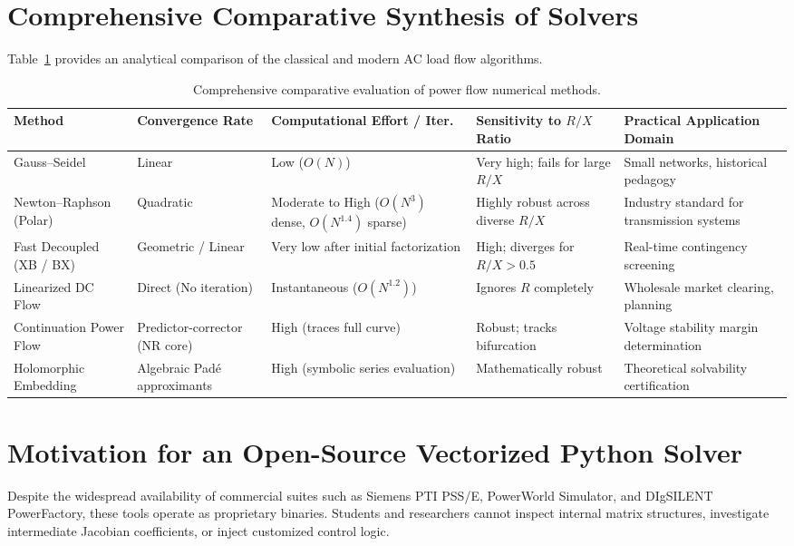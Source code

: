 \documentclass[12pt,a4paper,oneside]{report}
\begin{document}
\section{Comprehensive Comparative Synthesis of Solvers}
Table~\ref{tab:solver_comparison} provides an analytical comparison of the classical and modern AC load flow algorithms.

\begin{table}[htbp]
\centering
\caption{Comprehensive comparative evaluation of power flow numerical methods.}
\label{tab:solver_comparison}
\small
\begin{tabular}{p{3.2cm}p{2.6cm}p{2.6cm}p{2.6cm}p{3.2cm}}
\toprule
\textbf{Method} & \textbf{Convergence Rate} & \textbf{Computational Effort / Iter.} & \textbf{Sensitivity to $R/X$ Ratio} & \textbf{Practical Application Domain} \\
\midrule
Gauss--Seidel & Linear & Low ($O(N)$) & Very high; fails for large $R/X$ & Small networks, historical pedagogy \\
\addlinespace[3pt]
Newton--Raphson (Polar) & Quadratic & Moderate to High ($O(N^3)$ dense, $O(N^{1.4})$ sparse) & Highly robust across diverse $R/X$ & Industry standard for transmission systems \\
\addlinespace[3pt]
Fast Decoupled (XB / BX) & Geometric / Linear & Very low after initial factorization & High; diverges for $R/X > 0.5$ & Real-time contingency screening \\
\addlinespace[3pt]
Linearized DC Flow & Direct (No iteration) & Instantaneous ($O(N^{1.2})$) & Ignores $R$ completely & Wholesale market clearing, planning \\
\addlinespace[3pt]
Continuation Power Flow & Predictor-corrector (NR core) & High (traces full curve) & Robust; tracks bifurcation & Voltage stability margin determination \\
\addlinespace[3pt]
Holomorphic Embedding & Algebraic Pad\'e approximants & High (symbolic series evaluation) & Mathematically robust & Theoretical solvability certification \\
\bottomrule
\end{tabular}
\end{table}

\section{Motivation for an Open-Source Vectorized Python Solver}
Despite the widespread availability of commercial suites such as Siemens PTI PSS/E, PowerWorld Simulator, and DIgSILENT PowerFactory, these tools operate as proprietary binaries. Students and researchers cannot inspect internal matrix structures, investigate intermediate Jacobian coefficients, or inject customized control logic.
\end{document}
